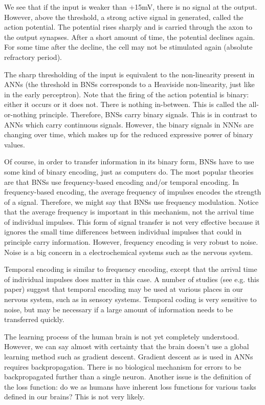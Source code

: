 We see that if the input is weaker than $+$15mV, there is no signal at the output. However, above the threshold, a strong active signal in generated, called the action potential. The potential rises sharply and is carried through the axon to the output synapses. After a short amount of time, the potential declines again. For some time after the decline, the cell may not be stimulated again (absolute refractory period).

The sharp thresholding of the input is equivalent to the non-linearity present in ANNs (the threshold in BNSs corresponds to a Heaviside non-linearity, just like in the early perceptron). Note that the firing of the action potential is binary: either it occurs or it does not. There is nothing in-between. This is called the all-or-nothing principle. Therefore, BNSs carry binary signals. This is in contrast to ANNs which carry continuous signals. However, the binary signals in NNNs are changing over time, which makes up for the reduced expressive power of binary values.

Of course, in order to transfer information in its binary form, BNSs have to use some kind of binary encoding, just as computers do. The most popular theories are that BNSs use frequency-based encoding and/or temporal encoding. In frequency-based encoding, the average frequency of impulses encodes the strength of a signal. Therefore, we might say that BNSs use frequency modulation. Notice that the average frequency is important in this mechanism, not the arrival time of individual impulses. This form of signal transfer is not very effective because it ignores the small time differences between individual impulses that could in principle carry information. However, frequency encoding is very robust to noise. Noise is a big concern in a electrochemical systems such as the nervous system.

Temporal encoding is similar to frequency encoding, except that the arrival time of individual impulses does matter in this case. A number of studies (see e.g. this paper) suggest that temporal encoding may be used at various places in our nervous system, such as in sensory systems. Temporal coding is very sensitive to noise, but may be necessary if a large amount of information needs to be transferred quickly.

The learning process of the human brain is not yet completely understood. However, we can say almost with certainty that the brain doesn't use a global learning method such as gradient descent. Gradient descent as is used in ANNs requires backpropagation. There is no biological mechanism for errors to be backpropagated further than a single neuron. Another issue is the definition of the loss function: do we as humans have inherent loss functions for various tasks defined in our brains? This is not very likely.

